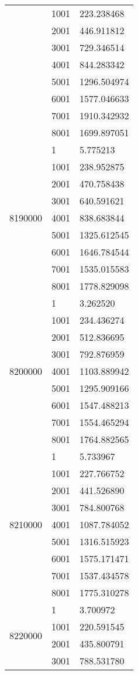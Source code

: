 \begin{table}[htb!]
\begin{tabular}{lll}
 & 1001 & 223.238468 \\
 & 2001 & 446.911812 \\
 & 3001 & 729.346514 \\
 & 4001 & 844.283342 \\
 & 5001 & 1296.504974 \\
 & 6001 & 1577.046633 \\
 & 7001 & 1910.342932 \\
 & 8001 & 1699.897051 \\
\multirow[c]{9}{*}{8190000} & 1 & 5.775213 \\
 & 1001 & 238.952875 \\
 & 2001 & 470.758438 \\
 & 3001 & 640.591621 \\
 & 4001 & 838.683844 \\
 & 5001 & 1325.612545 \\
 & 6001 & 1646.784544 \\
 & 7001 & 1535.015583 \\
 & 8001 & 1778.829098 \\
\multirow[c]{9}{*}{8200000} & 1 & 3.262520 \\
 & 1001 & 234.436274 \\
 & 2001 & 512.836695 \\
 & 3001 & 792.876959 \\
 & 4001 & 1103.889942 \\
 & 5001 & 1295.909166 \\
 & 6001 & 1547.488213 \\
 & 7001 & 1554.465294 \\
 & 8001 & 1764.882565 \\
\multirow[c]{9}{*}{8210000} & 1 & 5.733967 \\
 & 1001 & 227.766752 \\
 & 2001 & 441.526890 \\
 & 3001 & 784.800768 \\
 & 4001 & 1087.784052 \\
 & 5001 & 1316.515923 \\
 & 6001 & 1575.171471 \\
 & 7001 & 1537.434578 \\
 & 8001 & 1775.310278 \\
\multirow[c]{9}{*}{8220000} & 1 & 3.700972 \\
 & 1001 & 220.591545 \\
 & 2001 & 435.800791 \\
 & 3001 & 788.531780 \\

\end{tabular}
\end{table}
